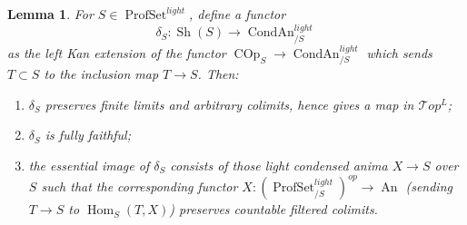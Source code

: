 \documentclass[12pt]{article}
\newtheorem{lemma}[theorem]{Lemma}
\newcommand{\on}{\operatorname}
\begin{document}
\begin{lemma}\label{etaleonprof}
For $S\in\on{ProfSet}^{light}$, define a functor
$$\delta_S:\on{Sh}(S)\rightarrow \on{CondAn}^{light}_{/S}$$
as the left Kan extension of the functor $\on{COp}_S\rightarrow \on{CondAn}^{light}_{/S}$ which sends $T\subset S$ to the inclusion map $T\rightarrow S$.  Then:
\begin{enumerate}
\item $\delta_S$ preserves finite limits and arbitrary colimits, hence gives a map in $\mathcal{T}op^L$;
\item $\delta_S$ is fully faithful;
\item the essential image of $\delta_S$ consists of those light condensed anima $X\rightarrow S$ over $S$ such that the corresponding functor $X:(\on{ProfSet}^{light}_{/S})^{op}\rightarrow \on{An}$ (sending $T\rightarrow S$ to $\on{Hom}_S(T,X)$) preserves countable filtered colimits.
\end{enumerate}
\end{lemma}
\end{document}
